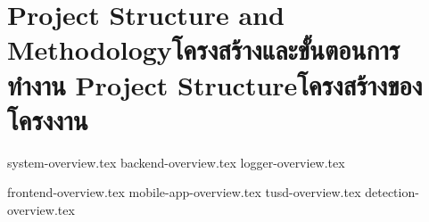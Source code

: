\chapter{\ifproject%
\ifenglish Project Structure and Methodology\else โครงสร้างและขั้นตอนการทำงาน\fi
\else%
\ifenglish Project Structure\else โครงสร้างของโครงงาน\fi
\fi
}

{system-overview.tex}
{backend-overview.tex}
{logger-overview.tex}

{frontend-overview.tex}
{mobile-app-overview.tex}
{tusd-overview.tex}
{detection-overview.tex}
